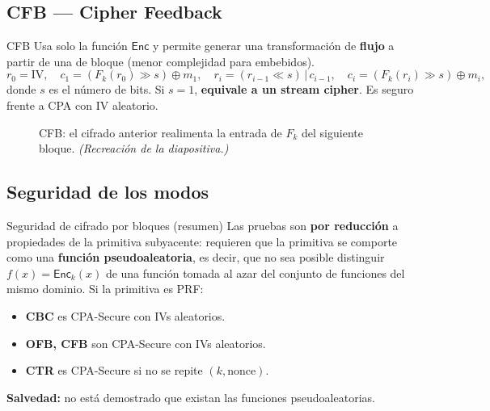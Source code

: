 \documentclass[11pt,a4paper]{article}
\newcommand{\xor}{\oplus}
\newcommand{\Enc}{\mathsf{Enc}}
\begin{document}
\subsection{CFB — Cipher Feedback}

\begin{defbox}{CFB}
Usa solo la función $\Enc$ y permite generar una transformación de \textbf{flujo} a partir
de una de bloque (menor complejidad para embebidos).
\[
  r_0=\mathrm{IV},\quad c_1 = (F_k(r_0)\!\gg\! s)\xor m_1,\quad
  r_i = (r_{i-1}\!\ll\! s)\,|\,c_{i-1},\quad c_i = (F_k(r_i)\!\gg\! s)\xor m_i,
\]
donde $s$ es el número de bits. Si $s=1$, \textbf{equivale a un stream cipher}. Es seguro
frente a CPA con IV aleatorio.
\end{defbox}

\begin{figure}[h]
\centering
{}
\caption{CFB: el cifrado anterior realimenta la entrada de $F_k$ del siguiente bloque.
\textit{(Recreación de la diapositiva.)}}
\end{figure}

\subsection{Seguridad de los modos}

\begin{defbox}{Seguridad de cifrado por bloques (resumen)}
Las pruebas son \textbf{por reducción} a propiedades de la primitiva subyacente:
requieren que la primitiva se comporte como una \textbf{función pseudoaleatoria}, es
decir, que no sea posible distinguir $f(x)=\Enc_k(x)$ de una función tomada al azar del
conjunto de funciones del mismo dominio. Si la primitiva es PRF:
\begin{itemize}[leftmargin=1.4em,itemsep=1pt]
  \item \textbf{CBC} es CPA-Secure con IVs aleatorios.
  \item \textbf{OFB, CFB} son CPA-Secure con IVs aleatorios.
  \item \textbf{CTR} es CPA-Secure si no se repite $(k,\text{nonce})$.
\end{itemize}
\textbf{Salvedad:} no está demostrado que existan las funciones pseudoaleatorias.
\end{defbox}
\end{document}
